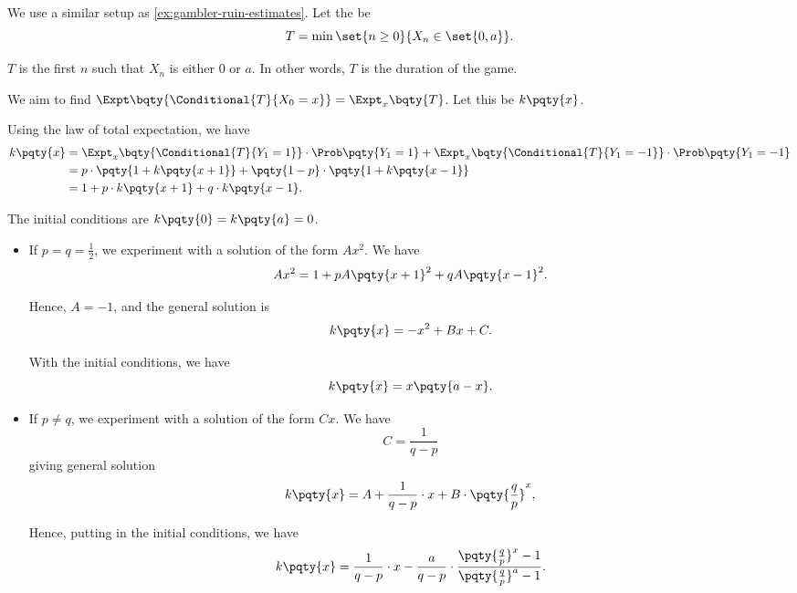 \begin{example}
    \label{ex:time-to-absorption}%
    We use a similar setup as \autoref{ex:gambler-ruin-estimates}. Let the  be
    \[
        T = \min \set{n \geq 0}{X_n \in \set{0, a}}.
    \]

    \(T\) is the first \(n\) such that \(X_n\) is either \(0\) or \(a\). In other words, \(T\) is the duration of the game.

    We aim to find \(\Expt\bqty{\Conditional{T}{X_0 = x}} = \Expt_x\bqty{T}\). Let this be \(k\pqty{x}\).

    Using the law of total expectation, we have
    \begin{align*}
        k\pqty{x} &= \Expt_x\bqty{\Conditional{T}{Y_1 = 1}} \cdot \Prob\pqty{Y_1 = 1} + \Expt_x\bqty{\Conditional{T}{Y_1 = -1}} \cdot \Prob\pqty{Y_1 = -1} \\
        &= p \cdot \pqty{1 + k\pqty{x + 1}} + \pqty{1 - p} \cdot \pqty{1 + k\pqty{x - 1}} \\
        &= 1 + p \cdot k\pqty{x + 1} + q \cdot k\pqty{x - 1}.
    \end{align*}

    The initial conditions are \(k \pqty{0} = k \pqty{a} = 0\).
    \begin{itemize}
        \item If \(p = q = \frac{1}{2}\), we experiment with a solution of the form \(A x^2\). We have
        \[
            A x^2 = 1 + p A\pqty{x + 1}^2 + q A\pqty{x - 1}^2.
        \]

        Hence, \(A = -1\), and the general solution is
        \[
            k\pqty{x}= -x^2 + Bx + C.
        \]

        With the initial conditions, we have
        \[
            k\pqty{x} = x \pqty{a - x}.
        \]

        \item If \(p \neq q\), we experiment with a solution of the form \(Cx\). We have
        \[
            C = \frac{1}{q - p}
        \]
        giving general solution
        \[
            k\pqty{x} = A + \frac{1}{q - p} \cdot x + B \cdot \pqty{\frac{q}{p}}^x,
        \]

        Hence, putting in the initial conditions, we have
        \[
            k\pqty{x} = \frac{1}{q - p} \cdot x - \frac{a}{q - p} \cdot \frac{\pqty{\frac{q}{p}}^x - 1}{\pqty{\frac{q}{p}}^a - 1}.
        \]
    \end{itemize}
\end{example}